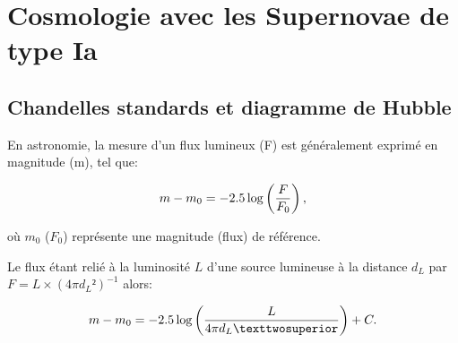 \documentclass[a4paper, 12pt, svgnames]{article}
\newcommand{\mr}[1]{{\textcolor[rgb]{0.80,0.10,0.1}{#1}}}
\begin{document}
%


\section{Cosmologie avec les Supernovae de type Ia}
\label{sec:cosmo}

\subsection{Chandelles standards et diagramme de Hubble}\label{ssec:hub}

\mr{En astronomie, la mesure d'un flux lumineux (F) est généralement exprimé en
magnitude (m), tel que:}

\begin{equation}
    m - m_0 = -2.5\log\left(\frac{F}{F_0}\right),
\end{equation}

\mr{où $m_0$ ($F_0$) représente une magnitude (flux) de référence.}

\mr{Le flux étant relié à la luminosité $L$ d'une source lumineuse à la distance
$d_L$ par $F = L\times \left(4\pi d_L²\right)^{-1}$ alors:}

\begin{equation}
    m - m_0 = -2.5\log\LR{L}{4\pi d_L²} + C.
\end{equation}
\end{document}
